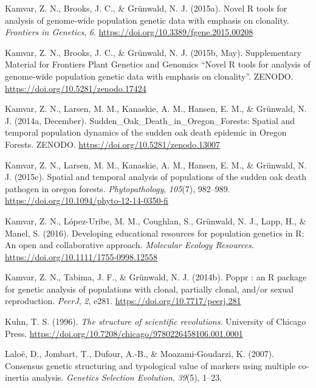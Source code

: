 \documentclass[double,11pt]{beavtex}
\begin{document}
  \hypertarget{ref-kamvar2015novel}{}
  Kamvar, Z. N., Brooks, J. C., \& Grünwald, N. J. (2015a). Novel R tools
  for analysis of genome-wide population genetic data with emphasis on
  clonality. \emph{Frontiers in Genetics}, \emph{6}.
  \url{https://doi.org/10.3389/fgene.2015.00208}
  
  \hypertarget{ref-kamvar2015poppr2supp}{}
  Kamvar, Z. N., Brooks, J. C., \& Grünwald, N. J. (2015b, May).
  Supplementary Material for Frontiers Plant Genetics and Genomics ``Novel
  R tools for analysis of genome-wide population genetic data with
  emphasis on clonality''. ZENODO.
  \url{https://doi.org/10.5281/zenodo.17424}
  
  \hypertarget{ref-kamvar2014sudden}{}
  Kamvar, Z. N., Larsen, M. M., Kanaskie, A. M., Hansen, E. M., \&
  Grünwald, N. J. (2014a, December).
  Sudden\_Oak\_Death\_in\_Oregon\_Forests: Spatial and temporal population
  dynamics of the sudden oak death epidemic in Oregon Forests. ZENODO.
  \url{https://doi.org/10.5281/zenodo.13007}
  
  \hypertarget{ref-kamvar2015spatial}{}
  Kamvar, Z. N., Larsen, M. M., Kanaskie, A. M., Hansen, E. M., \&
  Grünwald, N. J. (2015c). Spatial and temporal analysis of populations of
  the sudden oak death pathogen in oregon forests. \emph{Phytopathology},
  \emph{105}(7), 982--989.
  \url{https://doi.org/10.1094/phyto-12-14-0350-fi}
  
  \hypertarget{ref-kamvar2016developing}{}
  Kamvar, Z. N., López-Uribe, M. M., Coughlan, S., Grünwald, N. J., Lapp,
  H., \& Manel, S. (2016). Developing educational resources for population
  genetics in R: An open and collaborative approach. \emph{Molecular
  Ecology Resources}. \url{https://doi.org/10.1111/1755-0998.12558}
  
  \hypertarget{ref-kamvar2014poppr}{}
  Kamvar, Z. N., Tabima, J. F., \& Grünwald, N. J. (2014b). Poppr : an R
  package for genetic analysis of populations with clonal, partially
  clonal, and/or sexual reproduction. \emph{PeerJ}, \emph{2}, e281.
  \url{https://doi.org/10.7717/peerj.281}
  
  \hypertarget{ref-kuhn1996structure}{}
  Kuhn, T. S. (1996). \emph{The structure of scientific revolutions}.
  University of Chicago Press.
  \url{https://doi.org/10.7208/chicago/9780226458106.001.0001}
  
  \hypertarget{ref-laloe2007consensus}{}
  Laloë, D., Jombart, T., Dufour, A.-B., \& Moazami-Goudarzi, K. (2007).
  Consensus genetic structuring and typological value of markers using
  multiple co-inertia analysis. \emph{Genetics Selection Evolution},
  \emph{39}(5), 1--23.
  
\end{document}
